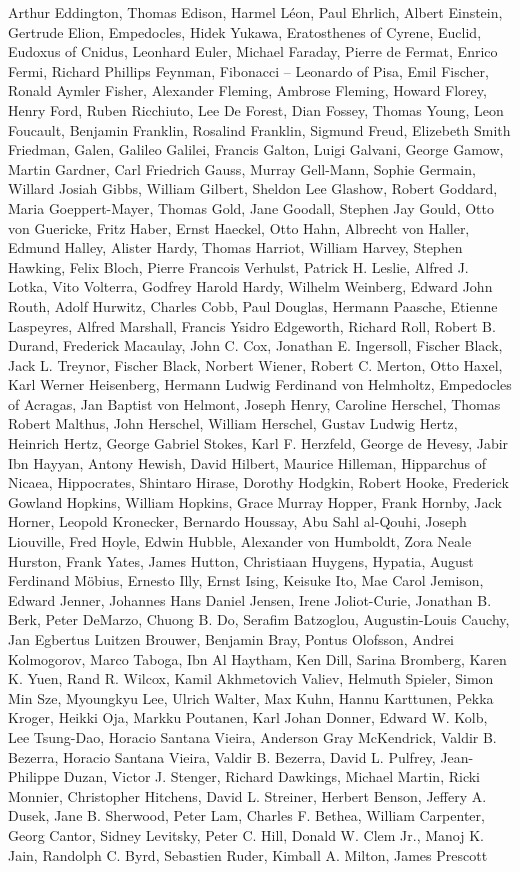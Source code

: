 \begin{spacing}{0.5}
\begin{tiny}
Arthur Eddington, Thomas Edison, Harmel Léon, Paul Ehrlich, Albert Einstein, Gertrude Elion, Empedocles, Hidek Yukawa, Eratosthenes of Cyrene, Euclid, Eudoxus of Cnidus, Leonhard Euler, Michael Faraday, Pierre de Fermat, Enrico Fermi, Richard Phillips Feynman, Fibonacci – Leonardo of Pisa, Emil Fischer, Ronald Aymler Fisher, Alexander Fleming, Ambrose Fleming, Howard Florey, Henry Ford, Ruben Ricchiuto, Lee De Forest, Dian Fossey, Thomas Young, Leon Foucault, Benjamin Franklin, Rosalind Franklin, Sigmund Freud, Elizebeth Smith Friedman, Galen, Galileo Galilei, Francis Galton, Luigi Galvani, George Gamow, Martin Gardner, Carl Friedrich Gauss, Murray Gell-Mann, Sophie Germain, Willard Josiah Gibbs, William Gilbert, Sheldon Lee Glashow, Robert Goddard, Maria Goeppert-Mayer, Thomas Gold, Jane Goodall, Stephen Jay Gould, Otto von Guericke, Fritz Haber, Ernst Haeckel, Otto Hahn, Albrecht von Haller, Edmund Halley, Alister Hardy, Thomas Harriot, William Harvey, Stephen Hawking, Felix Bloch, Pierre Francois Verhulst, Patrick H. Leslie, Alfred J. Lotka, Vito Volterra, Godfrey Harold Hardy, Wilhelm Weinberg, Edward John Routh, Adolf Hurwitz, Charles Cobb, Paul Douglas, Hermann Paasche, Etienne Laspeyres, Alfred Marshall, Francis Ysidro Edgeworth, Richard Roll, Robert B. Durand, Frederick Macaulay, John C. Cox, Jonathan E. Ingersoll, Fischer Black, Jack L. Treynor, Fischer Black, Norbert Wiener, Robert C. Merton, Otto Haxel, Karl Werner Heisenberg, Hermann Ludwig Ferdinand von Helmholtz, Empedocles of Acragas, Jan Baptist von Helmont, Joseph Henry, Caroline Herschel, Thomas Robert Malthus, John Herschel, William Herschel, Gustav Ludwig Hertz, Heinrich Hertz, George Gabriel Stokes, Karl F. Herzfeld, George de Hevesy, Jabir Ibn Hayyan, Antony Hewish, David Hilbert, Maurice Hilleman, Hipparchus of Nicaea, Hippocrates, Shintaro Hirase, Dorothy Hodgkin, Robert Hooke, Frederick Gowland Hopkins, William Hopkins, Grace Murray Hopper, Frank Hornby, Jack Horner, Leopold Kronecker, Bernardo Houssay, Abu Sahl al-Qouhi, Joseph Liouville, Fred Hoyle, Edwin Hubble, Alexander von Humboldt, Zora Neale Hurston, Frank Yates, James Hutton, Christiaan Huygens, Hypatia, August Ferdinand Möbius, Ernesto Illy, Ernst Ising, Keisuke Ito, Mae Carol Jemison, Edward Jenner, Johannes Hans Daniel Jensen, Irene Joliot-Curie, Jonathan B. Berk, Peter DeMarzo, Chuong B. Do, Serafim Batzoglou, Augustin-Louis Cauchy, Jan Egbertus Luitzen Brouwer, Benjamin Bray, Pontus Olofsson, Andrei Kolmogorov, Marco Taboga, Ibn Al Haytham, Ken Dill, Sarina Bromberg, Karen K. Yuen, Rand R. Wilcox, Kamil Akhmetovich Valiev, Helmuth Spieler, Simon Min Sze, Myoungkyu Lee, Ulrich Walter, Max Kuhn, Hannu Karttunen, Pekka Kroger, Heikki Oja, Markku Poutanen, Karl Johan Donner, Edward W. Kolb, Lee Tsung-Dao, Horacio Santana Vieira, Anderson Gray McKendrick, Valdir B. Bezerra, Horacio Santana Vieira, Valdir B. Bezerra, David L. Pulfrey, Jean-Philippe Duzan, Victor J. Stenger, Richard Dawkings, Michael Martin, Ricki Monnier, Christopher Hitchens, David L. Streiner, Herbert Benson, Jeffery A. Dusek, Jane B. Sherwood, Peter Lam, Charles F. Bethea, William Carpenter, Georg Cantor, Sidney Levitsky, Peter C. Hill, Donald W. Clem  Jr., Manoj K. Jain, Randolph C. Byrd, Sebastien Ruder, Kimball A. Milton, James Prescott 
\end{tiny}
\end{spacing}
